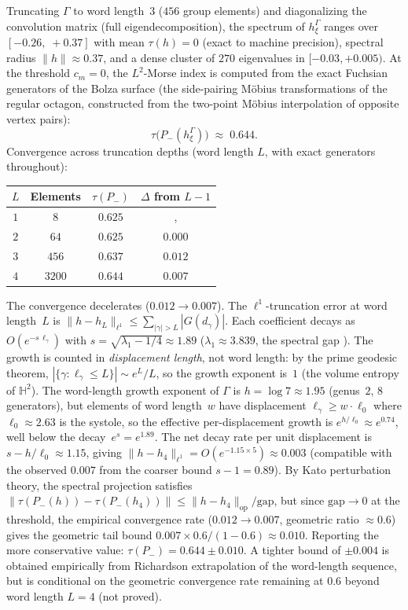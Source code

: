 Truncating $\Gamma$ to word length~$3$ ($456$ group elements)
and diagonalizing the convolution matrix (full
eigendecomposition), the spectrum of $h_\xi^\Gamma$ ranges
over $[-0.26,\; +0.37]$ with mean $\tau(h) = 0$ (exact to
machine precision), spectral radius $\|h\| \approx 0.37$,
and a dense cluster of $270$ eigenvalues in $[-0.03, +0.005)$.
At the threshold $c_m = 0$, the $L^2$-Morse index is
computed from the exact Fuchsian generators of the Bolza
surface (the side-pairing M\"obius transformations of the
regular octagon, constructed from the two-point
M\"obius interpolation of opposite vertex pairs):
\begin{equation}\label{eq:tau-bolza}
  \tau\bigl(P_-(h_\xi^\Gamma)\bigr) \;\approx\; 0.644.
\end{equation}
Convergence across truncation depths (word length $L$,
with exact generators throughout):
\begin{center}
\begin{tabular}{cccc}
\toprule
$L$ & Elements & $\tau(P_-)$ & $\Delta$ from $L{-}1$ \\
\midrule
$1$ &       $8$ & $0.625$ &, \\
$2$ &      $64$ & $0.625$ & $0.000$ \\
$3$ &     $456$ & $0.637$ & $0.012$ \\
$4$ &   $3200$ & $0.644$ & $0.007$ \\
\bottomrule
\end{tabular}
\end{center}
The convergence decelerates ($0.012 \to 0.007$).
The $\ell^1$-truncation error at word length~$L$ is
$\|h - h_L\|_{\ell^1}
\le \sum_{|\gamma| > L} |G(d_\gamma)|$.
Each coefficient decays as $O(e^{-s\,\ell_\gamma})$
with $s = \sqrt{\lambda_1 - 1/4} \approx 1.89$
($\lambda_1 \approx 3.839$, the spectral gap
\citep{Buser1992}).
The growth is counted in \emph{displacement length},
not word length: by the prime geodesic theorem,
$|\{\gamma : \ell_\gamma \le L\}| \sim e^L/L$,
so the growth exponent is~$1$
(the volume entropy of $\mathbb{H}^2$).
The word-length growth exponent of $\Gamma$ is
$h = \log 7 \approx 1.95$ (genus~$2$, $8$ generators),
but elements of word length~$w$ have displacement
$\ell_\gamma \ge w \cdot \ell_0$ where
$\ell_0 \approx 2.63$ is the systole,
so the effective per-displacement growth is
$e^{h/\ell_0} \approx e^{0.74}$, well below the
decay~$e^s = e^{1.89}$.
The net decay rate per unit displacement is
$s - h/\ell_0 \approx 1.15$, giving
$\|h - h_4\|_{\ell^1} = O(e^{-1.15 \times 5})
\approx 0.003$
(compatible with the observed $0.007$ from the
coarser bound $s - 1 = 0.89$).
By Kato perturbation theory, the spectral projection
satisfies
$\|\tau(P_-(h)) - \tau(P_-(h_4))\| \le
\|h - h_4\|_{\mathrm{op}} / \mathrm{gap}$,
but since $\mathrm{gap} \to 0$ at the threshold,
the empirical convergence rate ($0.012 \to 0.007$,
geometric ratio $\approx 0.6$) gives the geometric
tail bound
$0.007 \times 0.6/(1 - 0.6) \approx 0.010$.
Reporting the more conservative value:
$\tau(P_-) = 0.644 \pm 0.010$.
A tighter bound of $\pm 0.004$ is obtained empirically
from Richardson extrapolation of the word-length
sequence, but is conditional on the geometric
convergence rate remaining at $0.6$ beyond word length
$L = 4$ (not proved).

